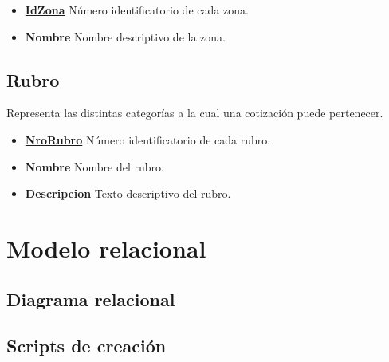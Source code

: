 \documentclass[a4paper,11pt]{article}
\begin{document}
\begin{itemize}
   
  \item \textbf{\uline{IdZona}} Número identificatorio de cada zona.
  
  \item \textbf{Nombre} Nombre descriptivo de la zona.
  
\end{itemize}

\subsection{Rubro}

Representa las distintas categorías a la cual una cotización puede pertenecer.

\begin{itemize}
   
  \item \textbf{\uline{NroRubro}} Número identificatorio de cada rubro.
  
  \item \textbf{Nombre} Nombre del rubro.

  \item \textbf{Descripcion} Texto descriptivo del rubro.
  
\end{itemize}

\clearpage

\section{Modelo relacional}

\subsection{Diagrama relacional}


\begin{figure}[h!t]
\end{figure}

\FloatBarrier

\subsection{Scripts de creación}
\end{document}
